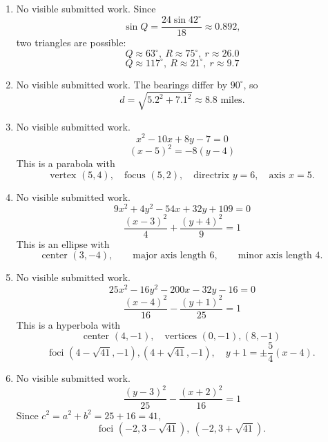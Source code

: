 \documentclass[11pt]{article}
\begin{document}
\begin{enumerate}[leftmargin=*, itemsep=1.1em]
  \item No visible submitted work. Since
  \[
  \sin Q=\frac{24\sin42^\circ}{18}\approx 0.892,
  \]
  two triangles are possible:
  \[
  \boxed{Q\approx 63^\circ,\ R\approx 75^\circ,\ r\approx 26.0}
  \]
  \[
  \boxed{Q\approx 117^\circ,\ R\approx 21^\circ,\ r\approx 9.7}
  \]

  \item No visible submitted work. The bearings differ by $90^\circ$, so
  \[
  d=\sqrt{5.2^2+7.1^2}\approx \boxed{8.8\text{ miles}}.
  \]

  \item No visible submitted work.
  \[
  x^2-10x+8y-7=0
  \]
  \[
  (x-5)^2=-8(y-4)
  \]
  This is a parabola with
  \[
  \boxed{\text{vertex }(5,4)},\quad
  \boxed{\text{focus }(5,2)},\quad
  \boxed{\text{directrix }y=6},\quad
  \boxed{\text{axis }x=5}.
  \]

  \item No visible submitted work.
  \[
  9x^2+4y^2-54x+32y+109=0
  \]
  \[
  \frac{(x-3)^2}{4}+\frac{(y+4)^2}{9}=1
  \]
  This is an ellipse with
  \[
  \boxed{\text{center }(3,-4)},\qquad
  \boxed{\text{major axis length }6},\qquad
  \boxed{\text{minor axis length }4}.
  \]

  \item No visible submitted work.
  \[
  25x^2-16y^2-200x-32y-16=0
  \]
  \[
  \frac{(x-4)^2}{16}-\frac{(y+1)^2}{25}=1
  \]
  This is a hyperbola with
  \[
  \boxed{\text{center }(4,-1)},\quad
  \boxed{\text{vertices }(0,-1),(8,-1)}
  \]
  \[
  \boxed{\text{foci }(4-\sqrt{41},-1),(4+\sqrt{41},-1)},\quad
  \boxed{y+1=\pm\frac54(x-4)}.
  \]

  \item No visible submitted work.
  \[
  \boxed{\frac{(y-3)^2}{25}-\frac{(x+2)^2}{16}=1}
  \]
  Since $c^2=a^2+b^2=25+16=41$,
  \[
  \boxed{\text{foci }(-2,3-\sqrt{41}),\ (-2,3+\sqrt{41})}.
  \]
\end{enumerate}
\end{document}
